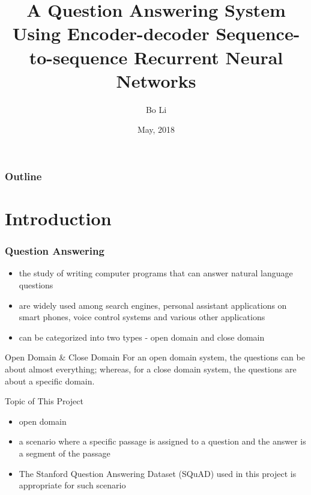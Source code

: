 \documentclass{beamer}
\begin{document}
\raggedright

\title{A Question Answering System Using Encoder-decoder Sequence-to-sequence Recurrent Neural Networks}
\author{Bo Li}
\date{May, 2018}

\begin{frame}
\titlepage

\end{frame}

\begin{frame}

  \frametitle{Outline}

  \tableofcontents[hideallsubsections]

\end{frame}



\section{Introduction}

\begin{frame} \frametitle{Question Answering}
    \begin{itemize}
        \item the study of writing computer programs that can answer natural language questions
        \item are widely used among search engines, personal assistant applications on smart phones, voice control systems and various other applications
        \item  can be categorized into two types - open domain and close domain
    \end{itemize}
\end{frame}

\begin{frame}{Open Domain \& Close Domain}
    For an open domain system, the questions can be about almost everything; whereas, for a close domain system, the questions are about a specific domain.
\end{frame}

\begin{frame}{Topic of This Project}
    \begin{itemize}
        \item open domain
        \item a scenario where a specific passage is assigned to a question and the answer is a segment of the passage
        \item The Stanford Question Answering Dataset (SQuAD) used in this project is appropriate for such scenario
    \end{itemize}
\end{frame}
\end{document}
